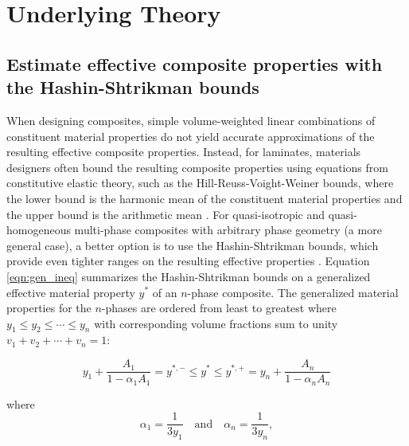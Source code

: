 \documentclass[letterpaper,12pt]{formatfile}
\begin{document}
\section{Underlying Theory} \label{sec:theory}

\subsection{Estimate effective composite properties with the Hashin-Shtrikman bounds} \label{subsec:HS-bounds}
When designing composites, simple volume-weighted linear combinations of constituent material properties do not yield accurate approximations of the resulting effective composite properties. Instead, for laminates, materials designers often bound the resulting composite properties using equations from constitutive elastic theory, such as the Hill-Reuss-Voight-Weiner bounds, where the lower bound is the harmonic mean of the constituent material properties and the upper bound is the arithmetic mean \citep{commentaryHS}. For quasi-isotropic and quasi-homogeneous multi-phase composites with arbitrary phase geometry (a more general case), a better option is to use the Hashin-Shtrikman bounds, which provide even tighter ranges on the resulting effective properties \citep{hashin1962variational}. Equation \ref{eqn:gen_ineq} summarizes the Hashin-Shtrikman bounds on a generalized effective material property $y^{*}$ of an $n$-phase composite. The generalized material properties for the $n$-phases are ordered from least to greatest where $y_{1} \leq y_{2} \leq \dotsb \leq y_{n}$ with corresponding volume fractions sum to unity $v_{1} + v_{2} + \dotsb + v_{n} = 1$:

\begin{equation}
y_{1} + \frac{A_{1}}{1 - \alpha_{1}A_{1}}
= y^{*,-} \leq y^{*} \leq y^{*,+} = 
y_{n} + \frac{A_{n}}{1 - \alpha_{n}A_{n}}
\label{eqn:gen_ineq}
\end{equation}

\noindent where
\begin{equation}
\alpha_{1} = \frac{1}{3y_{1}}
\quad \text{and} \quad
\alpha_{n} = \frac{1}{3y_{n}},
\label{eqn:gen_alphas}
\end{equation}
\end{document}
